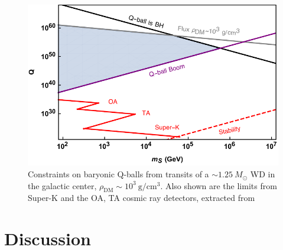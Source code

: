 \documentclass[twocolumn,preprintnumbers,amsmath,amssymb,prl, superscriptaddress]{revtex4}
\begin{document}
\begin{figure}
\includegraphics[scale=.55]{Qballconstraint.pdf}
\caption{Constraints on baryonic Q-balls from transits of a $\sim 1.25 ~M_{\odot}$ WD in the galactic center, $\rho_\text{DM} \sim 10^3 ~\text{g}/\text{cm}^3$. Also shown are the limits from Super-K and the OA, TA cosmic ray detectors, extracted from \cite{Dine:2003ax}}
\label{fig:Qballconstraint}
\end{figure}

\section{Discussion}
\label{sec:Discussion}
\end{document}
